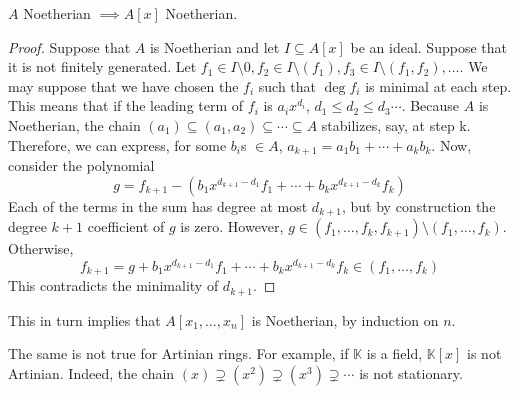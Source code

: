 \begin{theorem}
    $A$ Noetherian $\implies A[x]$ Noetherian.
    \begin{proof}
        Suppose that $A$ is Noetherian and let $I \subseteq A[x]$ be an ideal.
        Suppose that it is not finitely generated.
        Let $f_1 \in I \setminus 0,
        f_2 \in I \setminus (f_1),
        f_3 \in I \setminus (f_1, f_2),
        \dots$.
        We may suppose that we have chosen the $f_i$ such that $\deg f_i$ is minimal at each step.
        This means that if the leading term of $f_i$ is $a_i x^{d_i}$,
        $d_1 \leq d_2 \leq d_3 \cdots$.
        Because $A$ is Noetherian, the chain
        $(a_1) \subseteq (a_1, a_2) \subseteq \cdots \subseteq A$
        stabilizes, say, at step k.
        Therefore, we can express, for some $b_i$s $\in A$,
        $a_{k+1} = a_1 b_1 + \cdots + a_{k} b_{k}$.
        Now, consider the polynomial
        \[
            g = f_{k+1} - ( b_1 x^{d_{k+1} - d_1} f_1 + \cdots + b_k x^{d_{k+1} - d_k} f_k)
        \]
        Each of the terms in the sum has degree at most $d_{k+1}$,
        but by construction the degree $k+1$ coefficient of $g$ is zero.
        However, $g \in (f_1, \dots, f_k, f_{k+1}) \setminus (f_1, \dots, f_k)$.
        Otherwise,
        \[
        f_{k+1} = g + b_1 x^{d_{k+1} - d_1} f_1 +
        \cdots + b_k x^{d_{k+1} - d_k} f_k \in (f_1, \dots, f_k)
        \]
        This contradicts the minimality of $d_{k+1}$.

    \end{proof}
\end{theorem}

\begin{rk}
    This in turn implies that $A[x_1, \dots, x_n]$ is Noetherian, by induction on $n$.
\end{rk}

\begin{rk}
    The same is not true for Artinian rings.
    For example, if $\mathbb{K}$ is a field, $\mathbb{K}[x]$ is not Artinian.
    Indeed, the chain $(x) \supsetneq (x^2) \supsetneq (x^3) \supsetneq \cdots$ is not stationary.
\end{rk}